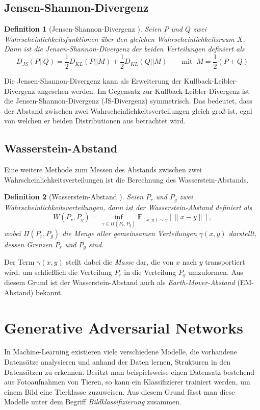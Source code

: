 \documentclass{hsflensburg}
\newtheorem{definition}{Definition}
\begin{document}
  \section{Jensen-Shannon-Divergenz}
  \begin{definition}[Jensen-Shannon-Divergenz \cite{arjovsky2017wasserstein}]
    Seien $P$ und $Q$ zwei Wahr\-schein\-lichkeitsfunktionen über den gleichen
    Wahrscheinlichkeitsraum $X$. Dann ist die Jensen-Shannon-Divergenz der
    beiden Verteilungen definiert als
    \[
      D_{JS}(P \lvert\lvert Q) = \frac{1}{2} D_{KL}(P \lvert\lvert M) + \frac{1}{2} D_{KL}(Q \lvert\lvert M) \quad\quad \text{mit} \;\; M = \frac{1}{2}(P + Q)
    \]
  \end{definition}
  Die Jensen-Shannon-Divergenz kann als Erweiterung der
  Kullback-Leibler-Divergenz angesehen werden. Im Gegensatz zur
  Kullback-Leibler-Divergenz ist die Jensen-Shannon-Divergenz (JS-Divergenz)
  symmetrisch. Das bedeutet, dass der Abstand zwischen zwei
  Wahrscheinlichkeitsverteilungen gleich groß ist, egal von welchen er beiden
  Distributionen aus betrachtet wird.

  \section{Wasserstein-Abstand}
  Eine weitere Methode zum Messen des Abstands zwischen zwei
  Wahrscheinlichkeitsverteilungen ist die Berechnung des Wasserstein-Abstands.

  \begin{definition}[Wasserstein-Abstand \cite{arjovsky2017wasserstein}]
    Seien $P_r$ und $P_g$ zwei Wahrscheinlichkeitsverteilungen, dann ist der
    Wasserstein-Abstand definiert als
    \[
      W(P_r, P_g) = \inf_{\gamma \in \Pi(P_r, P_g)} \mathbb{E}_{(x, y) \sim \gamma} \left[\|x - y\|\right],
    \]
    wobei $\Pi(P_r, P_g)$ die Menge aller gemeinsamen Verteilungen $\gamma(x,
    y)$ darstellt, dessen Grenzen $P_r$ und $P_g$ sind.
  \end{definition}

  Der Term $\gamma(x, y)$ stellt dabei die \textit{Masse} dar, die von $x$ nach
  $y$ transportiert wird, um schließlich die Verteilung $P_r$ in die Verteilung
  $P_g$ umzuformen. Aus diesem Grund ist der Wasserstein-Abstand auch als
  \textit{Earth-Mover-Abstand} (EM-Abstand) bekannt.

  \chapter{Generative Adversarial Networks}
  In Machine-Learning existieren viele verschiedene Modelle, die vorhandene
  Datensätze analysieren und anhand der Daten lernen, Strukturen in den
  Datensätzen zu erkennen.  Besitzt man beispielsweise einen Datensatz
  bestehend aus Fotoaufnahmen von Tieren, so kann ein Klassifizierer trainiert
  werden, um einem Bild eine Tierklasse zuzuweisen. Aus diesem Grund fässt man
  diese Modelle unter dem Begriff \textit{Bildklassifizierung} zusammen.
\end{document}
